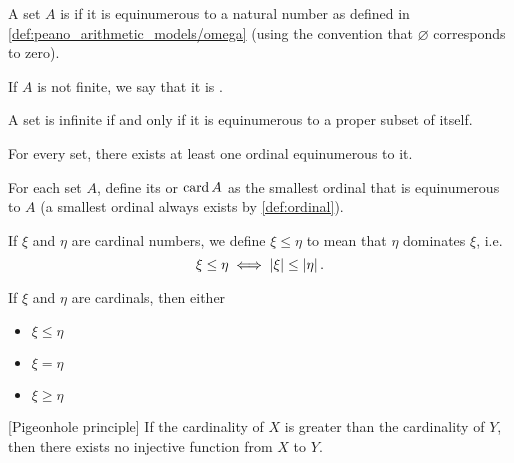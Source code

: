 \begin{definition}\label{def:finite_set}\cite[133]{Enderton1977}
  A set \( A \) is  if it is equinumerous to a natural number as defined in \cref{def:peano_arithmetic_models/omega} (using the convention that \( \varnothing \) corresponds to zero).

  If \( A \) is not finite, we say that it is .
\end{definition}

\begin{proposition}\label{thm:infinite_set_iff_equinumerous_to_proper_subset}\cite[Corollary 6D]{Enderton1977}
  A set is infinite if and only if it is equinumerous to a proper subset of itself.
\end{proposition}

\begin{theorem}\label{thm:equinumerous_ordinal_existence}\cite[197]{Enderton1977}
  For every set, there exists at least one ordinal equinumerous to it.
\end{theorem}

\begin{definition}\label{def:cardinal}\cite[197]{Enderton1977}
  For each set \( A \), define its  or  \( \operatorname{card} A \) as the smallest ordinal that is equinumerous to \( A \) (a smallest ordinal always exists by \cref{def:ordinal}).

  If \( \xi \) and \( \eta \) are cardinal numbers, we define \( \xi \leq \eta \) to mean that \( \eta \) dominates \( \xi \), i.e.
  \begin{equation*}
    \xi \leq \eta \iff \left\vert \xi \right\vert \leq \left\vert \eta \right\vert.
  \end{equation*}
\end{definition}

\begin{theorem}\label{thm:cardinal_trichotomy}\cite[theorem 6M(5)]{Enderton1977}
  If \( \xi \) and \( \eta \) are cardinals, then either
  \begin{itemize}
    \item \( \xi \leq \eta \)
    \item \( \xi = \eta \)
    \item \( \xi \geq \eta \)
  \end{itemize}
\end{theorem}

\begin{corollary}\label{def:pigeonhole_principle}[Pigeonhole principle]
  If the cardinality of \( X \) is greater than the cardinality of \( Y \), then there exists no injective function from \( X \) to \( Y \).
\end{corollary}

